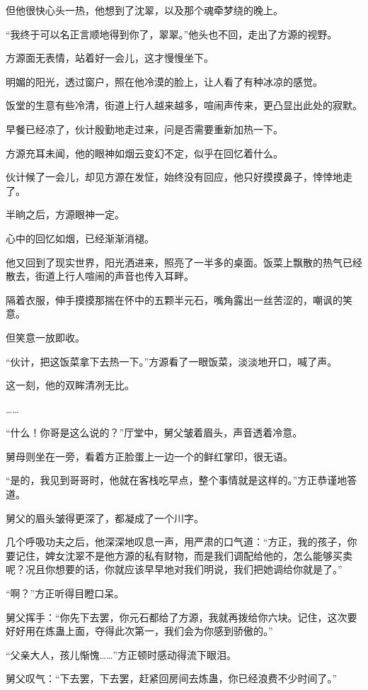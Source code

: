 \begin{this_body}
但他很快心头一热，他想到了沈翠，以及那个魂牵梦绕的晚上。

“我终于可以名正言顺地得到你了，翠翠。”他头也不回，走出了方源的视野。

方源面无表情，站着好一会儿，这才慢慢坐下。

明媚的阳光，透过窗户，照在他冷漠的脸上，让人看了有种冰凉的感觉。

饭堂的生意有些冷清，街道上行人越来越多，喧闹声传来，更凸显出此处的寂默。

早餐已经凉了，伙计殷勤地走过来，问是否需要重新加热一下。

方源充耳未闻，他的眼神如烟云变幻不定，似乎在回忆着什么。

伙计候了一会儿，却见方源在发怔，始终没有回应，他只好摸摸鼻子，悻悻地走了。

半晌之后，方源眼神一定。

心中的回忆如烟，已经渐渐消褪。

他又回到了现实世界，阳光洒进来，照亮了一半多的桌面。饭菜上飘散的热气已经散去，街道上行人喧闹的声音也传入耳畔。

隔着衣服，伸手摸摸那揣在怀中的五颗半元石，嘴角露出一丝苦涩的，嘲讽的笑意。

但笑意一放即收。

“伙计，把这饭菜拿下去热一下。”方源看了一眼饭菜，淡淡地开口，喊了声。

这一刻，他的双眸清冽无比。

……

“什么！你哥是这么说的？”厅堂中，舅父皱着眉头，声音透着冷意。

舅母则坐在一旁，看着方正脸蛋上一边一个的鲜红掌印，很无语。

“是的，我见到哥哥时，他就在客栈吃早点，整个事情就是这样的。”方正恭谨地答道。

舅父的眉头皱得更深了，都凝成了一个川字。

几个呼吸功夫之后，他深深地叹息一声，用严肃的口气道：“方正，我的孩子，你要记住，婢女沈翠不是他方源的私有财物，而是我们调配给他的，怎么能够买卖呢？况且你想要的话，你就应该早早地对我们明说，我们把她调给你就是了。”

“啊？”方正听得目瞪口呆。

舅父挥手：“你先下去罢，你元石都给了方源，我就再拨给你六块。记住，这次要好好用在炼蛊上面，夺得此次第一，我们会为你感到骄傲的。”

“父亲大人，孩儿惭愧……”方正顿时感动得流下眼泪。

舅父叹气：“下去罢，下去罢，赶紧回房间去炼蛊，你已经浪费不少时间了。”


\end{this_body}

